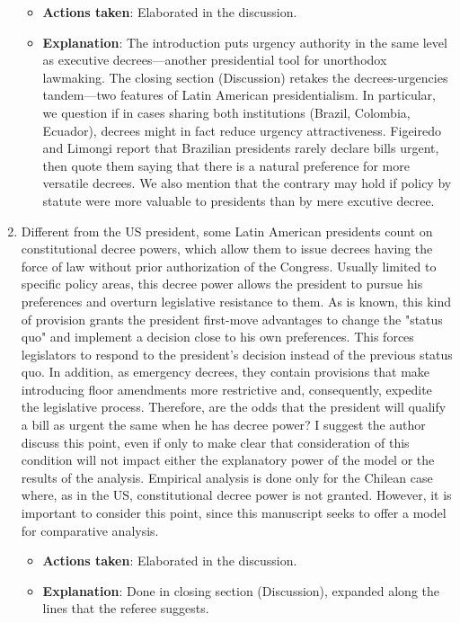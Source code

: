 \documentclass[article,letterpaper,times,12pt,listings-bw,microtype]{article}
\begin{document}
\begin{enumerate}
\label{sec:org389a939}
\begin{itemize}
\item \textbf{Actions taken}: Elaborated in the discussion.
\item \textbf{Explanation}: The introduction puts urgency authority in the same level as executive decrees---another presidential tool for unorthodox lawmaking. The closing section (Discussion) retakes the decrees-urgencies tandem---two features of Latin American presidentialism. In particular, we question if in cases sharing both institutions (Brazil, Colombia, Ecuador), decrees might in fact reduce urgency attractiveness. Figeiredo and Limongi report that Brazilian presidents rarely declare bills urgent, then quote them saying that there is a natural preference for more versatile decrees. We also mention that the contrary may hold if policy by statute were more valuable to presidents than by mere excutive decree.
\end{itemize}
\item Different from the US president, some Latin American presidents count on constitutional decree powers, which allow them to issue decrees having the force of law without prior authorization of the Congress. Usually limited to specific policy areas, this decree power allows the president to pursue his preferences and overturn legislative resistance to them.   As is known, this kind of provision grants the president first-move advantages to change the "status quo" and implement a decision close to his own preferences. This forces legislators to respond to the president's decision instead of the previous status quo. In addition, as emergency decrees, they contain provisions that make introducing floor amendments more restrictive and, consequently, expedite the legislative process. Therefore, are the odds that the president will qualify a bill as urgent the same when he has decree power? I suggest the author discuss this point, even if only to make clear that consideration of this condition will not impact either the explanatory power of the model or the results of the analysis. Empirical analysis is done only for the Chilean case where, as in the US, constitutional decree power is not granted. However, it is important to consider this point, since this manuscript seeks to offer a model for comparative analysis.
\label{sec:org9bfffd1}
\begin{itemize}
\item \textbf{Actions taken}: Elaborated in the discussion.
\item \textbf{Explanation}: Done in closing section (Discussion), expanded along the lines that the referee suggests.

\end{itemize}
\end{enumerate}
\end{document}
